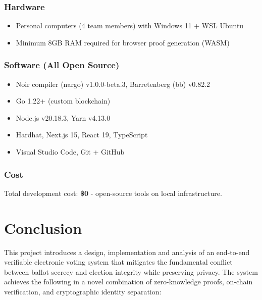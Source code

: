 \documentclass[12pt, a4paper]{report}
\begin{document}
\subsection{Hardware}
\begin{itemize}
    \item Personal computers (4 team members) with Windows 11 + WSL Ubuntu
    \item Minimum 8GB RAM required for browser proof generation (WASM)
\end{itemize}

\subsection{Software (All Open Source)}
\begin{itemize}
    \item Noir compiler (nargo) v1.0.0-beta.3, Barretenberg (bb) v0.82.2
    \item Go 1.22+ (custom blockchain)
    \item Node.js v20.18.3, Yarn v4.13.0
    \item Hardhat, Next.js 15, React 19, TypeScript
    \item Visual Studio Code, Git + GitHub
\end{itemize}

\subsection{Cost}
Total development cost: \textbf{\$0} - open-source tools on local infrastructure.


\chapter{Conclusion}

This project introduces a design, implementation and analysis of an end-to-end verifiable electronic voting system that mitigates the fundamental conflict between ballot secrecy and election integrity while preserving privacy. The system achieves the following in a novel combination of zero-knowledge proofs, on-chain verification, and cryptographic identity separation:
\end{document}
